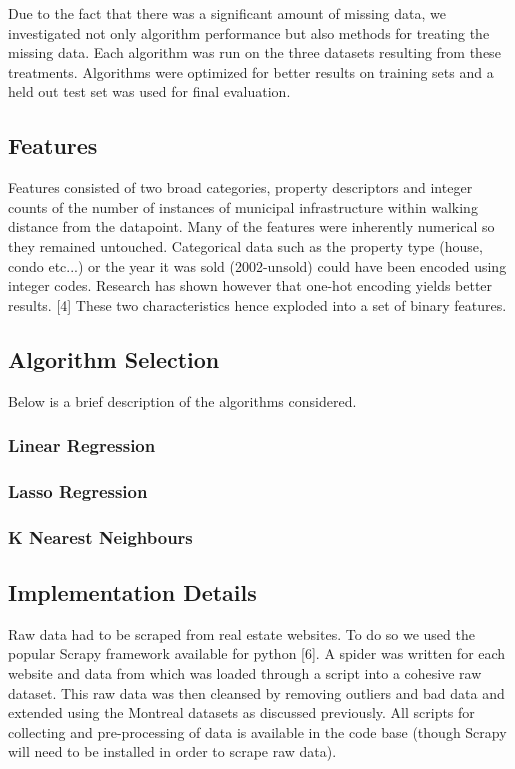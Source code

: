\documentclass{acm_proc_article-sp}
\begin{document}
	Due to the fact that there was a significant amount of missing data, we investigated not only algorithm performance but also methods for treating the missing data. Each algorithm was run on the three datasets resulting from these treatments. Algorithms were optimized for better results on training sets and a held out test set was used for final evaluation.
	
\subsection{Features}
	
	Features consisted of two broad categories, property descriptors and integer counts of the number of instances of municipal infrastructure within walking distance from the datapoint. Many of the features were inherently numerical so they remained untouched. Categorical data such as the property type (house, condo etc...) or the year it was sold (2002-unsold) could have been encoded using integer codes. Research has shown however that one-hot encoding yields better results. [4] These two characteristics hence exploded into a set of binary features.
	
\subsection{Algorithm Selection}
	Below is a brief description of the algorithms considered.
	
\subsubsection{Linear Regression}
\subsubsection{Lasso Regression}
\subsubsection{K Nearest Neighbours}

\subsection{Implementation Details}
	Raw data had to be scraped from real estate websites. To do so we used the popular Scrapy framework available for python [6]. A spider was written for each website and data from which was loaded through a script into a cohesive raw dataset. This raw data was then cleansed by removing outliers and bad data and extended using the Montreal datasets as discussed previously. All scripts for collecting and pre-processing of data is available in the code base (though Scrapy will need to be installed in order to scrape raw data).
	
\end{document}
